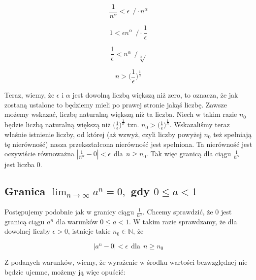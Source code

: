 \documentclass[a4paper,oneside,openright,11pt]{article}
\numberwithin{equation}{section}
\begin{document}
\begin{equation*}
    \frac{1}{n^\alpha} < \epsilon \ \  / \cdot n^\alpha
\end{equation*}

\begin{equation*}
    1 < \epsilon n^\alpha \ \  / \cdot \frac{1}{\epsilon}
\end{equation*}

\begin{equation*}
    \frac{1}{\epsilon} < n^\alpha \ \  / \sqrt[\alpha]{}
\end{equation*}

\begin{equation*}
    n > \big(\frac{1}{\epsilon}\big)^{\frac{1}{\alpha}}
\end{equation*}


Teraz, wiemy, że $\epsilon$ i $\alpha$ jest dowolną liczbą większą niż zero, to oznacza, że jak zostaną ustalone to będziemy mieli
po prawej stronie jakąś liczbę. Zawsze możemy wskazać, liczbę naturalną większą niż ta liczba. Niech w takim razie $n_0$ będzie
liczbą naturalną większą niż $\big(\frac{1}{\epsilon}\big)^{\frac{1}{\alpha}}$ tzn. $n_{0} > \big(\frac{1}{\epsilon}\big)^{\frac{1}{\alpha}}$.
Wskazaliśmy teraz właśnie istnienie liczby, od której (aż wzwyż, czyli liczby powyżej $n_0$ też spełniają tę nierówność) nasza przekształcona nierówność
jest spełniona. Ta nierówność jest oczywiście równoważna $|\frac{1}{n^\alpha} - 0| < \epsilon \ \ \textrm{dla} \ \ n \geq n_0$.
Tak więc granicą dla ciągu $\frac{1}{n^{\alpha}}$ jest liczba $0$.


\subsection{Granica $\lim_{n\to\infty} a^{n} = 0,$ gdy $0 \leq a < 1$} \label{RudnickiWzor15}


Postępujemy podobnie jak w granicy ciągu $\frac{1}{n^{\alpha}}$. Chcemy sprawdzić, że $0$ jest granicą ciągu $a^n$ dla warunków $0 \leq a < 1$.
W takim razie sprawdzamy, że dla dowolnej liczby $\epsilon > 0$, istnieje takie $n_0 \in \mathbb{N}$, że

\begin{equation*}
    |a^{n} - 0| < \epsilon \ \ \textrm{dla} \ \ n \geq n_0
\end{equation*}


\noindent
Z podanych warunków, wiemy, że wyrażenie w środku wartości bezwzględnej nie będzie ujemne, możemy ją więc opuścić:
\end{document}

